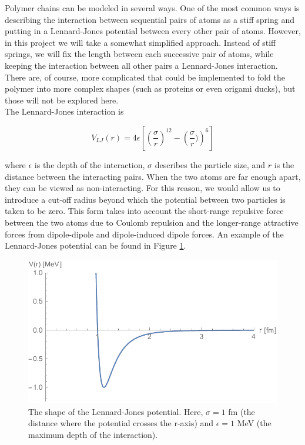 \documentclass{article}
\begin{document}
\begin{multicols}{2}
Polymer chains can be modeled in several ways.  One of the most common ways is describing the interaction between sequential pairs of atoms as a stiff spring and putting in a Lennard-Jones potential between every other pair of atoms.  \cite{PhilNotes}  However, in this project we will take a somewhat simplified approach.  Instead of stiff springs, we will fix the length between each successive pair of atoms, while keeping the interaction between all other pairs a Lennard-Jones interaction.  There are, of course, more complicated that could be implemented to fold the polymer into more complex shapes (such as proteins or even origami ducks), but those will not be explored here.\\

The Lennard-Jones interaction is 

\begin{equation}
\label{VLJ}
V_{LJ}(r) = 4\epsilon \left [ \left ( \frac{\sigma}{r} \right ) ^{12} - \left ( \frac{\sigma}{r}) \right ) ^6 \right ]
\end{equation}

\noindent where $\epsilon$ is the depth of the interaction, $\sigma$ describes the particle size, and $r$ is the distance between the interacting pairs.  When the two atoms are far enough apart, they can be viewed as non-interacting.  For this reason, we would allow us to introduce a cut-off radius beyond which the potential between two particles is taken to be zero.  This form takes into account the short-range repulsive force between the two atoms due to Coulomb repulsion and the longer-range attractive forces from dipole-dipole and dipole-induced dipole forces.  \cite{verlet}  An example of the Lennard-Jones potential can be found in Figure \ref{VLJfig}.

\begin{figure}[H]
\begin{center}
\includegraphics[width=\linewidth]{Figures/VLJ.pdf}
\caption{The shape of the Lennard-Jones potential.  Here, $\sigma=1$ fm (the distance where the potential crosses the r-axis) and $\epsilon =1$ MeV (the maximum depth of the interaction).}
\label{VLJfig}
\end{center}
\end{figure}


\end{multicols}
\end{document}
